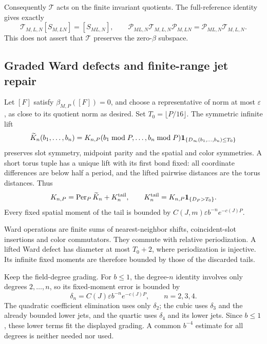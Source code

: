 Consequently \(\mathcal T\) acts on the finite invariant
quotients. The full-reference identity gives exactly
\begin{equation}
 \mathcal T_{M,L,N}[S_{M,LN}]=[S_{ML,N}],\qquad
 \mathcal P_{ML,N}\mathcal T_{M,L,N}\mathcal P_{M,LN}
       =\mathcal P_{ML,N}\mathcal T_{M,L,N}.
 \label{fcc-telescope}
\end{equation}
This does not assert that \(\mathcal T\) preserves the
zero-\(\beta\) subspace.

\subsection{Graded Ward defects and finite-range jet repair}
\label{fcc-repair-section}

Let \([F]\) satisfy \(\beta_{M,P}([F])=0\), and choose a
representative of norm at most \(\varepsilon\), as close
to its quotient norm as desired. Set \(T_0=\lfloor P/16\rfloor\).
The symmetric infinite lift
\begin{equation}
 \widetilde K_n(b_1,\ldots,b_n)
  =K_{n,P}(b_1\bmod P,\ldots,b_n\bmod P)
           {\bf1}_{\{D_\infty(b_1,\ldots,b_n)\le T_0\}}
 \label{fcc-short-lift}
\end{equation}
preserves slot symmetry, midpoint parity and the spatial
and color symmetries. A short torus tuple has a unique
lift with its first bond fixed: all coordinate differences
are below half a period, and the lifted pairwise distances
are the torus distances. Thus
\begin{equation}
 K_{n,P}=\operatorname{Per}_P\widetilde K_n+K_n^{\rm tail},
 \qquad
 K_n^{\rm tail}=K_{n,P}{\bf1}_{\{D_P>T_0\}}.
 \label{fcc-short-tail}
\end{equation}
Every fixed spatial moment of the tail is bounded by
\(C(J,m)\varepsilon b^{-n}e^{-c(J)P}\).

Ward operations are finite sums of nearest-neighbor
shifts, coincident-slot insertions and color commutators.
They commute with relative periodization. A lifted Ward
defect has diameter at most \(T_0+2\), where periodization
is injective. Its infinite fixed moments are therefore
bounded by those of the discarded tails.

Keep the field-degree grading. For \(b\le1\), the
degree-\(n\) identity involves only degrees \(2,\ldots,n\),
so its fixed-moment error is bounded by
\begin{equation}
 \delta_n=C(J)\varepsilon b^{-n}e^{-c(J)P},
       \qquad n=2,3,4.
 \label{fcc-graded-defect}
\end{equation}
The quadratic coefficient elimination uses only
\(\delta_2\); the cubic uses \(\delta_3\) and the already
bounded lower jets, and the quartic uses \(\delta_4\)
and its lower jets. Since \(b\le1\), these lower terms
fit the displayed grading. A common \(b^{-4}\) estimate
for all degrees is neither needed nor used.

